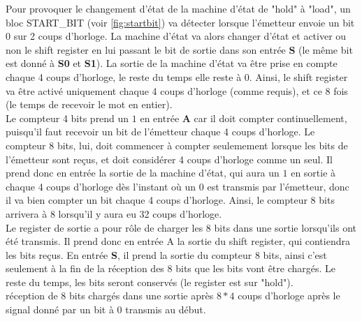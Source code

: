 \documentclass[a4paper]{article} %
\begin{document}
\begin{tcolorbox}[colframe=Monokaimagenta,colback=white]
Pour provoquer le changement d'état de la machine d'état de "hold" à "load", un bloc START\_BIT (voir \ref{fig:startbit}) va détecter lorsque l'émetteur envoie un bit $0$ sur 2 coups d'horloge. La machine d'état va alors changer d'état et activer ou non le shift register en lui passant le bit de sortie dans son entrée \textbf{S} (le même bit est donné à \textbf{S0} et \textbf{S1}). La sortie de la machine d'état va être prise en compte chaque 4 coups d'horloge, le reste du temps elle reste à 0. Ainsi, le shift register va être activé uniquement chaque 4 coups d'horloge (comme requis), et ce 8 fois (le temps de recevoir le mot en entier).\\
Le compteur 4 bits prend un $1$ en entrée \textbf{A} car il doit compter continuellement, puisqu'il faut recevoir un bit de l'émetteur chaque 4 coups d'horloge. Le compteur 8 bits, lui, doit commencer à compter seulemement lorsque les bits de l'émetteur sont reçus, et doit considérer 4 coups d'horloge comme un seul. Il prend donc en entrée la sortie de la machine d'état, qui aura un $1$ en sortie à chaque 4 coups d'horloge dès l'instant où un 0 est transmis par l'émetteur, donc il va bien compter un bit chaque 4 coups d'horloge. Ainsi, le compteur 8 bits arrivera à 8 lorsqu'il y aura eu 32 coups d'horloge.\\
Le register de sortie a pour rôle de charger les 8 bits dans une sortie lorsqu'ils ont été transmis. Il prend donc en entrée A la sortie du shift register, qui contiendra les bits reçus. En entrée \textbf{S}, il prend la sortie du compteur 8 bits, ainsi c'est seulement à la fin de la réception des 8 bits que les bits vont être chargés. Le reste du temps, les bits seront conservés (le register est sur "hold").\\
réception de 8 bits chargés dans une sortie après $8*4$ coups d'horloge après le signal donné par un bit à $0$ transmis au début.


\end{tcolorbox}
\end{document}
